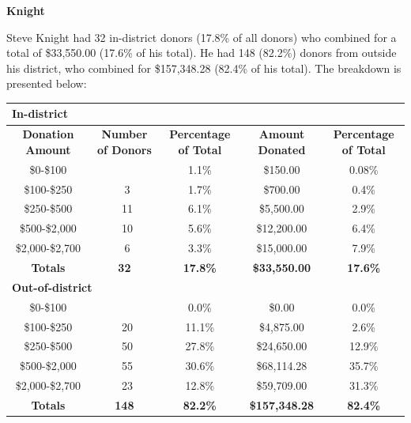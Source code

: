 \documentclass[10pt]{article}
\begin{document}
{\Large \bf{Knight}}

Steve Knight had 32 in-district donors (17.8\% of all donors) who combined for a total of \$33,550.00 (17.6\% of his total). He had 148 (82.2\%) donors from outside his district, who combined for \$157,348.28 (82.4\% of his total). The breakdown is presented below:

\begin{table}[ht]
\begin{tabularx}{\textwidth}{c | c c | c c}
\multicolumn{5}{l}{\bf{In-district}} \\ \hline
 \bf{Donation Amount} & \bf{Number of Donors} & \bf{Percentage of Total} & \bf{Amount Donated} & \bf{Percentage of Total} \\ \hline
\enspace \enspace \enspace \$0-\$100 &\quad \quad \quad 2 & 1.1\% &\quad \quad  \$150.00 & 0.08\%\\ \hline
\enspace \enspace \enspace \$100-\$250 &\quad \quad \quad \ 3 & 1.7\% &\quad \quad \$700.00 & 0.4\% \\ \hline
\enspace \enspace \enspace \$250-\$500 &\quad \quad \quad \ 11 & 6.1\% &\quad \quad\$5,500.00 & 2.9\%\\ \hline
\enspace \enspace \enspace \$500-\$2,000 &\quad \quad \quad \ 10 & 5.6\% &\quad \quad \$12,200.00 & 6.4\%\\ \hline
\enspace \enspace \enspace \$2,000-\$2,700 &\quad \quad \quad \ 6 & 3.3\% &\quad \quad \$15,000.00 & 7.9\% \\ \hline
\bf{Totals} & \quad \quad \quad \bf{32} & \bf{17.8\%} & \quad \quad \bf{\$33,550.00} & \bf{17.6\%} \\  
\hline \hline
\multicolumn{5}{l}{\bf{Out-of-district}} \\ \hline
\enspace \enspace \enspace \$0-\$100 &\quad \quad \quad 0 & 0.0\% &\quad \quad  \$0.00 & 0.0\%\\ \hline
\enspace \enspace \enspace \$100-\$250 &\quad \quad \quad \ 20 & 11.1\% &\quad \quad \$4,875.00 & 2.6\% \\ \hline
\enspace \enspace \enspace \$250-\$500 &\quad \quad \quad \ 50 & 27.8\% &\quad \quad\$24,650.00 & 12.9\%\\ \hline
\enspace \enspace \enspace \$500-\$2,000 &\quad \quad \quad \ 55 & 30.6\% &\quad \quad \$68,114.28 & 35.7\%\\ \hline
\enspace \enspace \enspace \$2,000-\$2,700 &\quad \quad \quad \ 23 & 12.8\% &\quad \quad \$59,709.00 & 31.3\% \\ \hline
\bf{Totals} & \quad \quad \quad \bf{148} & \bf{82.2\%} & \quad \quad \bf{\$157,348.28} & \bf{82.4\%}\\  

\end{tabularx}
\end{table}
\end{document}
